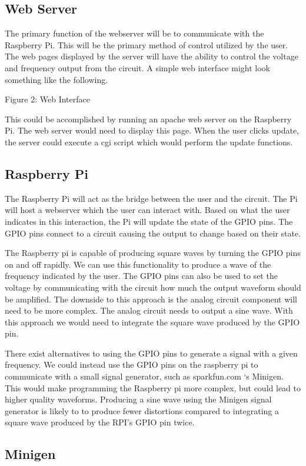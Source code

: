 \documentclass{article}	%
\begin{document}
\begin{multicols}{2}
\subsection{Web Server}
The primary function of the webserver will be to communicate with the Raspberry Pi. This will be the primary method of control utilized by the user. The web pages displayed by the server will have the ability to control the voltage and frequency output from the circuit. A simple web interface might look something like the following.

Figure 2: Web Interface

This could be accomplished by running an apache web server on the Raspberry Pi. The web server would need to display this page. When the user clicks update, the server could execute a cgi script which would perform the update functions.

\subsection{Raspberry Pi}

The Raspberry Pi will act as the bridge between the user and the circuit. The Pi will host a webserver which the user can interact with. Based on what the user indicates in this interaction, the Pi will update the state of the GPIO pins. The GPIO pins connect to a circuit causing the output to change based on their state. 

The Raspberry pi is capable of producing square waves by turning the GPIO pins on and off rapidly. We can use this functionality to produce a wave of the frequency indicated by the user. The GPIO pins can also be used to set the voltage by communicating with the circuit how much the output waveform should be amplified. The downside to this approach is the analog circuit component will need to be more complex. The analog circuit needs to output a sine wave. With this approach we would need to integrate the square wave produced by the GPIO pin.

There exist alternatives to using the GPIO pins to generate a signal with a given frequency. We could instead use the GPIO pins on the raspberry pi to communicate with a small signal generator, such as sparkfun.com ‘s Minigen. This would make programming the Raspberry pi more complex, but could lead to higher quality waveforms. Producing a sine wave using the Minigen signal generator is likely to to produce fewer distortions compared to integrating a square wave produced by the RPI’s GPIO pin twice. 
\subsection{Minigen}


\end{multicols}
\end{document}
